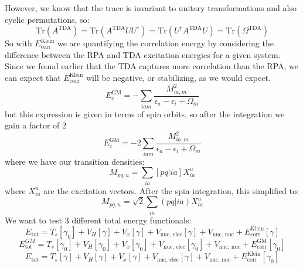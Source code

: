 \documentclass[12pt]{article}
\begin{document}
However, we know that the trace is invariant to unitary transformations and also cyclic permutations, so:
\begin{equation}
    \text{Tr} (A^{\text{TDA}}) = \text{Tr} (A^{\text{TDA}} UU^{\dagger}) = \text{Tr} (U^{\dagger} A^{\text{TDA}} U) = \text{Tr} (\Omega ^{\text{TDA}})
\end{equation}
So with $E_{\text{corr}}^{\text{Klein}}$ we are quantifying the correlation energy by considering the difference between the RPA and TDA excitation energies for a given system. Since we found earlier that the TDA captures more correlation than the RPA, we can expect that $E_{\text{corr}}^{\text{Klein}}$ will be negative, or stabilizing, as we would expect.
\begin{equation}
E_{\mathrm{c}}^{\mathrm{GM}}=-\sum_{i a m} \frac{M_{i a, m}^2}{\epsilon_a-\epsilon_i+\Omega_m}
\end{equation}
but this expression is given in terms of spin orbits, so after the integration we gain a factor of 2
\begin{equation}
E_{\mathrm{c}}^{\mathrm{GM}}=-2 \sum_{i a m} \frac{M_{i a, m}^2}{\epsilon_a-\epsilon_i+\Omega_m}
\end{equation}
where we have our transition densities:
\begin{equation}
    M_{pq,u} = \sum_{ia} [pq|ia] X_{ia}^u
\end{equation}
where $X_{ia}^u$ are the excitation vectors. After the spin integration, this simplified to:
\begin{equation}
    M_{pq,u} = \sqrt{2} \sum_{ia} (pq|ia) X_{ia}^u
\end{equation}
We want to test 3 different total energy functionals:
\begin{equation}
    E_{\text{tot}} = T_s [\gamma _{0}] + V_H [\gamma ] + V_x [\gamma ] + V_{\text{nuc, elec}} [\gamma ] + V_{\text{nuc, nuc}} + E_{\text{corr}} ^{\text{Klein}}[\gamma ]
\label{eq:klein1}
\end{equation}
\begin{equation}
    E_{\text{tot}}^{GM} = T_s [\gamma _{0} ] + V_H [\gamma _{0} ] + V_x [\gamma _{0} ] + V_{\text{nuc, elec}} [\gamma _{0} ] + V_{\text{nuc, nuc}} + E_{\text{corr}} ^{\text{GM}}[\gamma _{0}]
\end{equation}
\begin{equation}
    E_{\text{tot}} = T_s [\gamma ] + V_H [\gamma ] + V_x [\gamma ] + V_{\text{nuc, elec}} [\gamma ] + V_{\text{nuc, nuc}} + E_{\text{corr}} ^{\text{Klein}}[\gamma_0]
\label{eq:klein2}
\end{equation}
\end{document}
